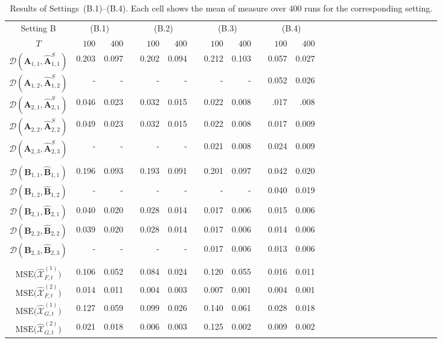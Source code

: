 \documentclass[aos]{imsart}
\theoremstyle{plain}
\theoremstyle{definition}
\def\wh#1{\widehat{#1}}
\def\cD{\mathcal{D}}
\def\cX{\mathcal{X}}
\def\bA{\mathbf{A}}
\def\bB{\mathbf{B}}
\begin{document}
\begin{table}%
\caption{Results of Settings~(B.1)--(B.4). Each cell shows the mean of measure over 400 runs for the corresponding setting.}
\label{tab: simulation_setting_B}
\begin{tabular}{@{}crrrrrrrrrrrrrrrrrrrrrrrrr@{}}
\hline %
Setting B & \multicolumn{2}{c}{(B.1)} && \multicolumn{2}{c}{(B.2)} && \multicolumn{2}{c}{(B.3)} && \multicolumn{2}{c}{(B.4)}  \\
$T$
&  $100$ & $400$ && $100$ & $400$ && $100$ & $400$
&& $100$ & $400$ \\
\hline %
$\cD(\bA_{1,1}, \wh{\bA}_{1,1}^S)$ &  0.203 & 0.097 && 0.202 & 0.094  && 0.212 & 0.103 && 0.057 & 0.027  \\
$\cD(\bA_{1,2}, \wh{\bA}_{1,2}^S)$ &  - & - && - & -  && - & - && 0.052 & 0.026  \\
$\cD(\bA_{2,1}, \wh{\bA}_{2,1}^S)$ &  0.046 & 0.023 && 0.032 & 0.015  && 0.022 & 0.008 && .017 & .008 \\
$\cD(\bA_{2,2}, \wh{\bA}_{2,2}^S)$ &  0.049 & 0.023 && 0.032 & 0.015  && 0.022 & 0.008 && 0.017 & 0.009  \\
$\cD(\bA_{2,3}, \wh{\bA}_{2,3}^S)$ &  - & - && - & -  && 0.021 & 0.008 && 0.024 & 0.009  \\
\\
$\cD(\bB_{1,1}, \wh{\bB}_{1,1})$ &  0.196 & 0.093 && 0.193 & 0.091  && 0.201 & 0.097 && 0.042 & 0.020  \\
$\cD(\bB_{1,2}, \wh{\bB}_{1,2})$ &  - & - && - & -  && - & - && 0.040 & 0.019  \\
$\cD(\bB_{2,1}, \wh{\bB}_{2,1})$ &  0.040 & 0.020 && 0.028 & 0.014  && 0.017 & 0.006 && 0.015 & 0.006 \\
$\cD(\bB_{2,2}, \wh{\bB}_{2,2})$ &  0.039 & 0.020 && 0.028 & 0.014  && 0.017 & 0.006 && 0.014 & 0.006  \\
$\cD(\bB_{2,3}, \wh{\bB}_{2,3})$ &  - & - && - & -  && 0.017 & 0.006 && 0.013 & 0.006  \\
\\
$\text{MSE}\big(\wh\cX_{F,t}^{(1)} \big)$ &  0.106 & 0.052 && 0.084 & 0.024  && 0.120 & 0.055 && 0.016 & 0.011  \\
$\text{MSE}\big(\wh\cX_{F,t}^{(2)} \big)$ &  0.014 & 0.011 && 0.004 & 0.003  && 0.007 & 0.001 && 0.004 & 0.001 \\
$\text{MSE}\big(\wh\cX_{G,t}^{(1)} \big)$ &  0.127 & 0.059 && 0.099 & 0.026  && 0.140 & 0.061 && 0.028 & 0.018 \\
$\text{MSE}\big(\wh\cX_{G,t}^{(2)} \big)$ &  0.021 & 0.018 && 0.006 & 0.003  && 0.125 & 0.002 && 0.009 & 0.002 \\
\hline %
\end{tabular}
\end{table}
\end{document}

